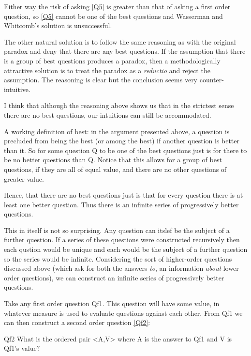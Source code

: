 Either way the risk of asking \ref{Q5} is greater than that of asking a first order question, so \ref{Q5} cannot be one of the best questions and Wasserman and Whitcomb's solution is unsuccessful.

The other natural solution is to follow the same reasoning as with the original paradox and deny that there are any best questions.
If the assumption that there is a group of best questions produces a paradox, then a methodologically attractive solution is to treat the paradox as a \textit{reductio} and reject the assumption.
The reasoning is clear but the conclusion seems very counter-intuitive.

I think that although the reasoning above shows us that in the strictest sense there are no best questions, our intuitions can still be accommodated.

A working definition of best: in the argument presented above, a question is precluded from being the best (or among the best) if another question is better than it.
So for some question Q to be one of the best questions just is for there to be no better questions than Q.
Notice that this allows for a group of best questions, if they are all of equal value, and there are no other questions of greater value.

Hence, that there are no best questions just is that for every question there is at least one better question.
Thus there is an infinite series of progressively better questions.

This in itself is not so surprising.
Any question can itslef be the subject of a further question.
If a series of these questions were constructed recursively then each qustion would be unique and each would be the subject of a further question so the series would be infinite.
Considering the sort of higher-order questions discussed above (which ask for both the answers \emph{to}, an information \emph{about} lower order questions), we can construct an infinite series of progressively better questions.

Take any first order question Qf1.
This question will have some value, in whatever measure is used to evaluate questions against each other.
From Qf1 we can then construct a second order question \ref{Qf2}:

	\begin{principle}{Qf2}\label{Qf2}
	What is the ordered pair <A,V> where A is the answer to Qf1 and V is Qf1's value?\footnotemark
	\end{principle}

